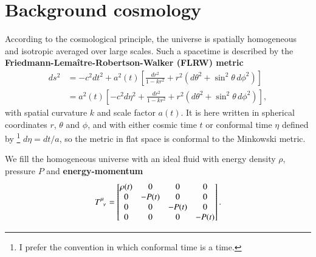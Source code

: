 \documentclass{aa}
\begin{document}
\section{Background cosmology}

According to the cosmological principle, the universe is spatially homogeneous and isotropic averaged over large scales.
Such a spacetime is described by the \textbf{Friedmann-Lemaître-Robertson-Walker (FLRW) metric}
\begin{equation}
\begin{split}
	ds^2 &= -c^2 dt^2 + a^2(t) \left[\frac{dr^2}{1 - kr^2} + r^2\left(d\theta^2 + \sin^2\theta \, d\phi^2\right) \right] \\
	     &= a^2(t) \left[-c^2 d\eta^2 + \frac{dr^2}{1 - kr^2} + r^2\left(d\theta^2 + \sin^2\theta \, d\phi^2\right) \right],
\end{split}
\label{eq_flrw}
\end{equation}
with spatial curvature $k$ and scale factor $a(t)$.
It is here written in spherical coordinates $r$, $\theta$ and $\phi$,
and with either cosmic time $t$ or conformal time $\eta$ defined by%
\footnote{I prefer the convention in which conformal time is a time.}
$d\eta = dt / a$, so the metric in flat space is conformal to the Minkowski metric.

We fill the homogeneous universe with an ideal fluid with energy density $\rho$, pressure $P$ and \textbf{energy-momentum}
\begin{equation}
	T\indices{^\mu_\nu} = \begin{bmatrix}
		\rho(t) & 0 & 0 & 0 \\
		0 & -P(t) & 0 & 0 \\
		0 & 0 & -P(t) & 0 \\
		0 & 0 & 0 & -P(t) \\
	\end{bmatrix}.
\label{eq_energy_momentum_homogeneous}
\end{equation}
\end{document}
